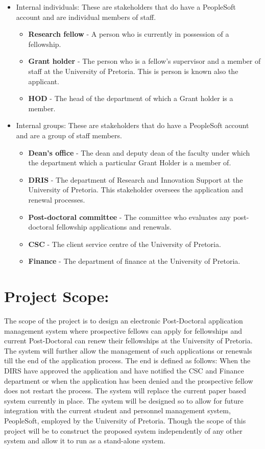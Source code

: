 \documentclass[12pt]{article}
\begin{document}
\begin{itemize}
\item Internal individuals:
These are stakeholders that do have a PeopleSoft account and are individual members of staff.
\begin{itemize}	
\item \textbf{Research fellow} - A person who is currently in possession of a fellowship.
\item \textbf{Grant holder} - The person who is a fellow's supervisor and a member of staff at the University of Pretoria. This is person is known also the applicant.
\item \textbf{HOD} - The head of the department of which a Grant holder is a member.
\end{itemize}
\item Internal groups:
These are stakeholders that do have a PeopleSoft account and are a group of staff members.
\begin{itemize}	
\item \textbf{Dean's office} - The dean and deputy dean of the faculty under which the department which a particular Grant Holder is a member of.
\item \textbf{DRIS} - The department of Research and Innovation Support at the University of Pretoria. This stakeholder oversees the application and renewal processes.
\item \textbf{Post-doctoral committee} - The committee who evaluates any post-doctoral fellowship applications and renewals.
\item \textbf{CSC} - The client service centre of the University of Pretoria.
\item \textbf{Finance} - The department of finance at the University of Pretoria.
\end{itemize}
\end{itemize}
\vspace{0.5in}

\newpage
\section{Project Scope:}
\vspace{0.2in}
	
The scope of the project is to design an electronic Post-Doctoral application management system where prospective fellows can apply for fellowships and current Post-Doctoral can renew their fellowships at the University of Pretoria. The system will further allow the management of such applications or renewals till the end of the application process. The end is defined as follows: When the DIRS have approved the application and have notified the CSC and Finance department or when the application has been denied and the prospective fellow does not restart the process. The system will replace the current paper based system currently in place. The system will be designed so to allow for future integration with the current student and personnel management system, PeopleSoft, employed by the University of Pretoria. Though the scope of this project will be to construct the proposed system independently of any other system and allow it to run as a stand-alone system.
\vspace{0.2in}
\end{document}
